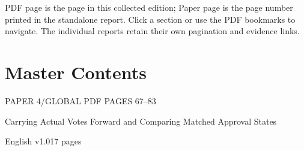 \documentclass[10pt,a4paper]{article}
\renewcommand{\arraystretch}{1.15}
\begin{document}
\vfill{\small PDF page is the page in this collected edition; Paper page is the page number printed in the standalone report. Click a section or use the PDF bookmarks to navigate. The individual reports retain their own pagination and evidence links.\par}
\clearpage\section{Master Contents}\label{contents-4}
{\sffamily\color{teal}\small PAPER 4\quad/\quad GLOBAL PDF PAGES 67--83\par}
{\sffamily\fontsize{11}{15}\selectfont Carrying Actual Votes Forward and Comparing Matched Approval States\par}
\medskip English v1.0\hfill 17 pages\par\medskip
\begingroup\fontsize{9.5}{12.5}\selectfont\renewcommand{\arraystretch}{1.18}
\end{document}
